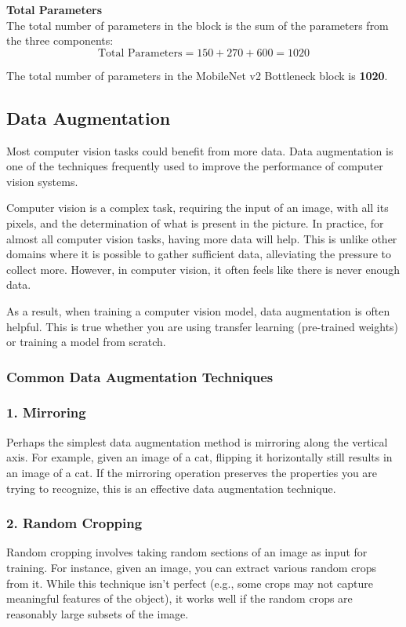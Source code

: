 \documentclass[letterpaper,12pt,notitlepage,twoside]{report}
\begin{document}
\textbf{Total Parameters} \\
The total number of parameters in the block is the sum of the parameters from the three components:
\[
\text{Total Parameters} = 150 + 270 + 600 = 1020
\]

The total number of parameters in the MobileNet v2 Bottleneck block is \textbf{1020}.

\subsection*{Data Augmentation}
Most computer vision tasks could benefit from more data. Data augmentation is one of the techniques frequently used to improve the performance of computer vision systems. 

Computer vision is a complex task, requiring the input of an image, with all its pixels, and the determination of what is present in the picture. In practice, for almost all computer vision tasks, having more data will help. This is unlike other domains where it is possible to gather sufficient data, alleviating the pressure to collect more. However, in computer vision, it often feels like there is never enough data. 

As a result, when training a computer vision model, data augmentation is often helpful. This is true whether you are using transfer learning (pre-trained weights) or training a model from scratch.

\subsubsection*{Common Data Augmentation Techniques}
\subsubsection*{1. Mirroring}
Perhaps the simplest data augmentation method is mirroring along the vertical axis. For example, given an image of a cat, flipping it horizontally still results in an image of a cat. If the mirroring operation preserves the properties you are trying to recognize, this is an effective data augmentation technique.

\subsubsection*{2. Random Cropping}
Random cropping involves taking random sections of an image as input for training. For instance, given an image, you can extract various random crops from it. While this technique isn't perfect (e.g., some crops may not capture meaningful features of the object), it works well if the random crops are reasonably large subsets of the image.
\end{document}
